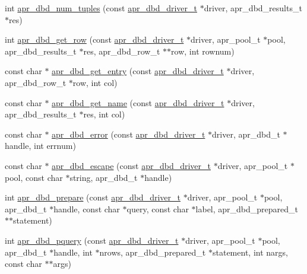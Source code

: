 \begin{DoxyCompactItemize}
\item 
int \hyperlink{group___a_p_r___util___d_b_d_ga2c9f511aba325f8904e69158eacd3987}{apr\-\_\-dbd\-\_\-num\-\_\-tuples} (const \hyperlink{structapr__dbd__driver__t}{apr\-\_\-dbd\-\_\-driver\-\_\-t} $\ast$driver, apr\-\_\-dbd\-\_\-results\-\_\-t $\ast$res)
\item 
int \hyperlink{group___a_p_r___util___d_b_d_gad4cdc5f4e8981b93f5a467a8c8a768f1}{apr\-\_\-dbd\-\_\-get\-\_\-row} (const \hyperlink{structapr__dbd__driver__t}{apr\-\_\-dbd\-\_\-driver\-\_\-t} $\ast$driver, apr\-\_\-pool\-\_\-t $\ast$pool, apr\-\_\-dbd\-\_\-results\-\_\-t $\ast$res, apr\-\_\-dbd\-\_\-row\-\_\-t $\ast$$\ast$row, int rownum)
\item 
const char $\ast$ \hyperlink{group___a_p_r___util___d_b_d_ga1d6d3b38a0d677e3d65501074832a5b8}{apr\-\_\-dbd\-\_\-get\-\_\-entry} (const \hyperlink{structapr__dbd__driver__t}{apr\-\_\-dbd\-\_\-driver\-\_\-t} $\ast$driver, apr\-\_\-dbd\-\_\-row\-\_\-t $\ast$row, int col)
\item 
const char $\ast$ \hyperlink{group___a_p_r___util___d_b_d_ga8eac8897bd1211564166b08492f458d7}{apr\-\_\-dbd\-\_\-get\-\_\-name} (const \hyperlink{structapr__dbd__driver__t}{apr\-\_\-dbd\-\_\-driver\-\_\-t} $\ast$driver, apr\-\_\-dbd\-\_\-results\-\_\-t $\ast$res, int col)
\item 
const char $\ast$ \hyperlink{group___a_p_r___util___d_b_d_gaffa947c657862c2996707da339482287}{apr\-\_\-dbd\-\_\-error} (const \hyperlink{structapr__dbd__driver__t}{apr\-\_\-dbd\-\_\-driver\-\_\-t} $\ast$driver, apr\-\_\-dbd\-\_\-t $\ast$handle, int errnum)
\item 
const char $\ast$ \hyperlink{group___a_p_r___util___d_b_d_gab5806cd6535aaeafe8e9f79ef2cc90c9}{apr\-\_\-dbd\-\_\-escape} (const \hyperlink{structapr__dbd__driver__t}{apr\-\_\-dbd\-\_\-driver\-\_\-t} $\ast$driver, apr\-\_\-pool\-\_\-t $\ast$pool, const char $\ast$string, apr\-\_\-dbd\-\_\-t $\ast$handle)
\item 
int \hyperlink{group___a_p_r___util___d_b_d_gacf21412447c4357c64d1e9200a0f5eec}{apr\-\_\-dbd\-\_\-prepare} (const \hyperlink{structapr__dbd__driver__t}{apr\-\_\-dbd\-\_\-driver\-\_\-t} $\ast$driver, apr\-\_\-pool\-\_\-t $\ast$pool, apr\-\_\-dbd\-\_\-t $\ast$handle, const char $\ast$query, const char $\ast$label, apr\-\_\-dbd\-\_\-prepared\-\_\-t $\ast$$\ast$statement)
\item 
int \hyperlink{group___a_p_r___util___d_b_d_ga1c4b005abda896011ca414679edfe112}{apr\-\_\-dbd\-\_\-pquery} (const \hyperlink{structapr__dbd__driver__t}{apr\-\_\-dbd\-\_\-driver\-\_\-t} $\ast$driver, apr\-\_\-pool\-\_\-t $\ast$pool, apr\-\_\-dbd\-\_\-t $\ast$handle, int $\ast$nrows, apr\-\_\-dbd\-\_\-prepared\-\_\-t $\ast$statement, int nargs, const char $\ast$$\ast$args)
$$
\end{DoxyCompactItemize}
